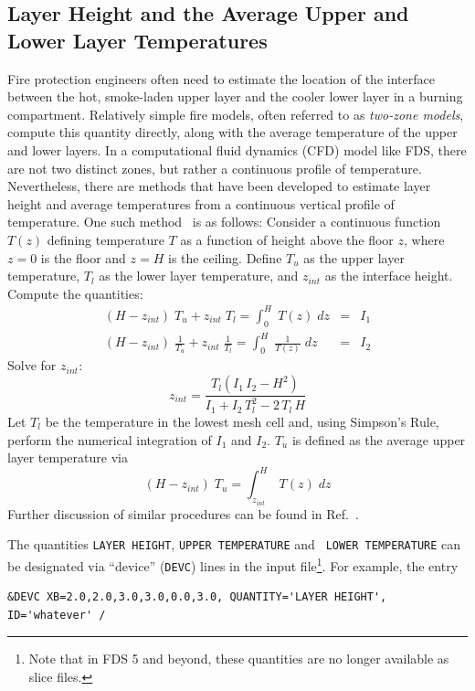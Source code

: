 \documentclass[11pt]{book}
\newcommand{\ct}{\tt\small}
\newcommand{\be}{\begin{equation}}
\newcommand{\ee}{\end{equation}}
\begin{document}
\subsection{Layer Height and the Average Upper and Lower Layer Temperatures}
\label{info:layerheight}

Fire protection engineers often need to estimate the location of the
interface between the hot, smoke-laden upper layer and the cooler
lower layer in a burning compartment.  Relatively simple fire models,
often referred to as {\em two-zone models}, compute this quantity
directly, along with the average temperature of the upper and lower
layers.  In a computational fluid dynamics (CFD) model like FDS, there
are not two distinct zones, but rather a continuous profile of
temperature. Nevertheless, there are methods that have been developed
to estimate layer height and average temperatures from a continuous
vertical profile of temperature. One such
method~\cite{Janssens:JFS1992} is as follows: Consider a continuous
function $T(z)$ defining temperature $T$ as a function of height above
the floor $z$, where $z=0$ is the floor and $z=H$ is the
ceiling. Define $T_u$ as the upper layer temperature, $T_l$ as the
lower layer temperature, and $z_{int}$ as the interface
height. Compute the quantities:
\begin{eqnarray*} (H-z_{int})\; T_u + z_{int} \; T_l = \int_0^H \; T(z) \; dz &=& I_1 \\
                  (H-z_{int})\; \frac{1}{T_u} + z_{int} \; \frac{1}{T_l} = \int_0^H \; \frac{1}{T(z)} \; dz &=& I_2 \end{eqnarray*}
Solve for $z_{int}$:
\be z_{int} = \frac{ T_l(I_1 \, I_2 - H^2)}{I_1+I_2 \, T_l^2 - 2\, T_l \, H} \ee
Let $T_l$ be the temperature in the lowest mesh cell and, using
Simpson's Rule, perform the numerical integration of $I_1$ and
$I_2$. $T_u$ is defined as the average upper layer temperature via
\be (H-z_{int})\; T_u = \int_{z_{int}}^H \; T(z) \; dz \ee
Further discussion of similar procedures can be found in Ref.~\cite{He:1}.

The quantities {\ct LAYER HEIGHT}, {\ct UPPER TEMPERATURE} and {\ct
LOWER TEMPERATURE} can be designated via ``device'' ({\ct DEVC}) lines
in the input file\footnote{Note that in FDS 5 and beyond, these
quantities are no longer available as slice files.}. For example, the
entry

\footnotesize
\begin{verbatim}
&DEVC XB=2.0,2.0,3.0,3.0,0.0,3.0, QUANTITY='LAYER HEIGHT', ID='whatever' /
\end{verbatim}
\normalsize
\end{document}

